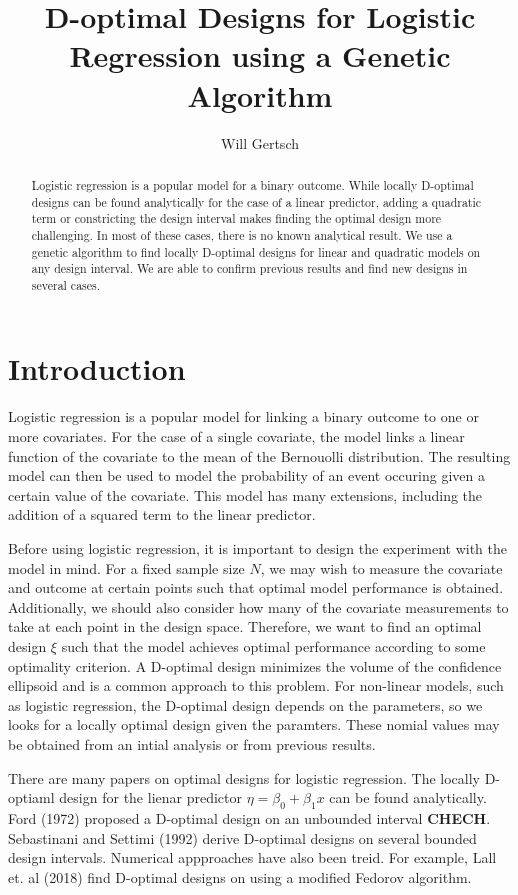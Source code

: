 \documentclass[11pt,a4paper]{article}
\title{D-optimal Designs for Logistic Regression using a Genetic Algorithm}
\author{Will Gertsch}
\begin{document}
\maketitle

\begin{abstract}
Logistic regression is a popular model for a binary outcome. While locally D-optimal designs can be found analytically for the case of a linear predictor, adding a quadratic term or constricting the design interval makes finding the optimal design more challenging. In most of these cases, there is no known analytical result. We use  a genetic algorithm to find locally D-optimal designs for linear and quadratic models on any design interval. We are able to confirm previous results and find new designs in several cases. 
\end{abstract}

\section{Introduction}
Logistic regression is a popular model for linking a binary outcome to one or more covariates. For the case of a single covariate, the model links a linear function of the covariate to the mean of the Bernouolli distribution. The resulting model can then be used to model the probability of an event occuring given a certain value of the covariate. This model has many extensions, including the addition of a squared term to the linear predictor.

Before using logistic regression, it is important to design the experiment with the model in mind. For a fixed sample size $N$, we may wish to measure the covariate and outcome at certain points such that optimal model performance is obtained. Additionally, we should also consider how many of the covariate measurements to take at each point in the design space. Therefore, we want to find an optimal design $\xi$ such that the model achieves optimal performance according to some optimality criterion. A D-optimal design minimizes the volume of the confidence ellipsoid and is a common approach to this problem. For non-linear models, such as logistic regression, the D-optimal design depends on the parameters, so we looks for a locally optimal design given the paramters. These nomial values may be obtained from an intial analysis or from previous results.

There are many papers on optimal designs for logistic regression. The locally D-optiaml design for the lienar predictor $\eta = \beta_0 + \beta_1 x$ can be found analytically. Ford (1972) proposed a D-optimal design on an unbounded interval \textbf{CHECH}. Sebastinani and Settimi (1992) derive D-optimal designs on several bounded design intervals. Numerical appproaches have also been treid. For example, Lall et. al (2018) find D-optimal designs on using a modified Fedorov algorithm.
\end{document}
